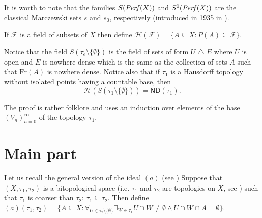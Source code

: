 \documentclass[12pt]{amsart}
\theoremstyle{plain}
\theoremstyle{definition}
\newtheorem{example}[theorem]{Example}
\theoremstyle{remark}
\newcommand{\Baire}{\mathfrak{Baire}}
\newcommand{\meager}{{\mathcal{MGR}}}
\newcommand{\Perf}{{\it Perf}}
\newcommand{\real}{\mathbb{R}}
\newcommand{\cF}{{\mathcal F}}
\newcommand{\cM}{{\mathcal M}}
\newcommand{\aideal}{\mathit{(a)}}
\newcommand{\topWithoutEmptyset}[1]{#1\setminus\lbrace\emptyset\rbrace}
\newcommand{\ND}{\mathsf{ND}}
\newcommand{\Hereditary}{\mathcal{H}}
\begin{document}
It is worth to note that the families $S(\Perf(X))$
and $S^0(\Perf(X))$ are the classical Marczewski sets
$s$ and $s_0$, respectively (introduced in 1935 in \cite{SM}).


If $\cF$ is a field of subsets of $X$ then define $\Hereditary(\cF) = \lbrace A \subseteq X \colon P(A) \subseteq \cF \rbrace$.

Notice that the field $S(\tau_e\setminus \lbrace \emptyset \rbrace)$
is the field of sets of form $U \bigtriangleup E$
where $U$ is open and $E$ is nowhere dense
which is the same as the collection of sets $A$ such that
$\mathrm{Fr}(A)$ is nowhere dense. Notice also 
that if $\tau_1$ is a Hausdorff topology without isolated points
having a countable base, then 
\begin{equation}\label{equation:hereditary_s_tau}
\Hereditary(S(\tau_1\setminus \lbrace \emptyset \rbrace)) = \ND(\tau_1).
\end{equation}

The proof is rather folklore and uses an induction over elements
of the base $(V_n)_{n=0}^\infty$ of the topology $\tau_1$.

\section{Main part}

Let us recall the general version of the ideal $(a)$
(see \cite{N})
Suppose that $(X, \tau_1,\tau_2)$ is a bitopological space 
(i.e. $\tau_1$ and $\tau_2$ are topologies on $X$, 
see \cite{D}
)
such that $\tau_1$ is coarser than $\tau_2$:
$\tau_1 \subseteq \tau_2$. Then 
define $\aideal(\tau_1, \tau_2) = \{ A \subseteq X \colon
\forall_{U \in \topWithoutEmptyset{\tau_2}}
\exists_{W \in \tau_1} U \cap W \not= \emptyset \wedge
U \cap W \cap A = \emptyset\}$.
\end{document}
